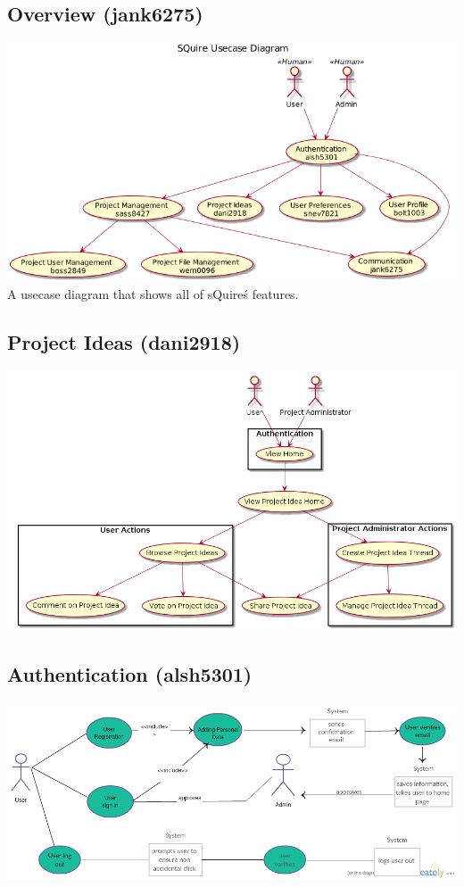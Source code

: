 \documentclass[11pt]{report}
\begin{document}
\subsection{Overview (jank6275)}
\includegraphics[width=\textwidth]{diagrams/overview-jank6275}
A usecase diagram that shows all of sQuire\'s features.

\subsection{Project Ideas (dani2918)}
\includegraphics[width=\textwidth]{diagrams/dani2918}

\subsection{Authentication (alsh5301)}
\includegraphics[width=\textwidth]{alsh5301_UserRegistration}
\end{document}
